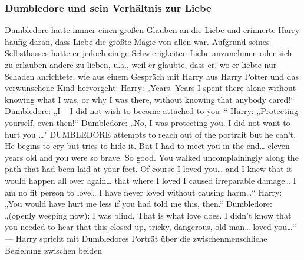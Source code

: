 \documentclass[a4paper, 10pt]{article}
\begin{document}
\subsubsection*{\large Dumbledore und sein Verhältnis zur Liebe}
Dumbledore hatte immer einen großen Glauben an die Liebe und erinnerte Harry häufig daran, dass Liebe die größte Magie von allen war. Aufgrund seines Selbsthasses hatte er jedoch einige Schwierigkeiten Liebe anzunehmen oder sich zu erlauben andere zu lieben, u.a., weil er glaubte, dass er, wo er liebte nur Schaden anrichtete, wie aus einem Gespräch mit Harry aus Harry Potter und das verwunschene Kind hervorgeht:
\vspace{10pt}
\newline
{}  
Harry: „Years. Years I spent there alone without knowing what I was, or why I was there, without knowing that anybody cared!“
\vspace{10pt}
\newline
{}  
Dumbledore: „I – I did not wish to become attached to you–“
\vspace{10pt}
\newline
{}  
Harry: „Protecting yourself, even then!“
\vspace{10pt}
\newline
{}  
Dumbledore: „No, I was protecting you. I did not want to hurt you …"
\vspace{10pt}
\newline
{}  
DUMBLEDORE attempts to reach out of the portrait but he can’t. He begins to cry but tries to hide it.
But I had to meet you in the end… eleven years old and you were so brave. So good. You walked uncomplainingly along the path that had been laid at your feet. Of course I loved you… and I knew that it would happen all over again… that where I loved I caused irreparable damage… I am no fit person to love… I have never loved without causing harm…“
\vspace{10pt}
\newline
{}  
Harry: „You would have hurt me less if you had told me this, then.“
\vspace{10pt}
\newline
{}  
Dumbledore: „(openly weeping now): I was blind. That is what love does. I didn’t know that you needed to hear that this closed-up, tricky, dangerous, old man… loved you…“
\vspace{10pt}
\newline
{}  
— Harry spricht mit Dumbledores Porträt über die zwischenmenschliche Beziehung zwischen beiden
\end{document}
